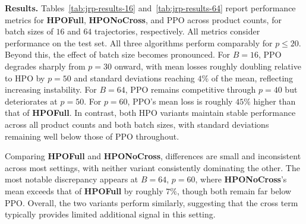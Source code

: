 \documentclass{article}
\theoremstyle{definition}
\theoremstyle{remark}
\begin{document}
\textbf{Results.} Tables~\ref{tab:jrp-results-16} and~\ref{tab:jrp-results-64} report 
performance metrics for \textbf{HPOFull}, \textbf{HPONoCross}, and PPO across product counts, for batch 
sizes of $16$ and $64$ trajectories, respectively. All metrics consider performance on the test set. All three algorithms perform 
comparably for $p \leq 20$. Beyond this, the effect of batch size becomes pronounced. 
For $B = 16$, PPO degrades sharply from $p = 30$ onward, with mean losses roughly 
doubling relative to HPO by $p = 50$ and standard deviations reaching $4\%$ of the 
mean, reflecting increasing instability. For $B = 64$, PPO remains competitive through 
$p = 40$ but deteriorates at $p = 50$. For $p=60$, PPO's mean loss is roughly $45\%$ 
higher than that of \textbf{HPOFull}. In contrast, both HPO variants maintain stable performance across all product counts and both batch sizes, with standard deviations remaining well below those of PPO throughout.

Comparing \textbf{HPOFull} and \textbf{HPONoCross}, differences are small and inconsistent across most 
settings, with neither variant consistently dominating the other. The most notable 
discrepancy appears at $B = 64$, $p = 60$, where \textbf{HPONoCross}'s mean exceeds that of \textbf{HPOFull} by roughly $7\%$, though both remain far below PPO. Overall, the 
two variants perform similarly, suggesting that the cross term typically provides limited 
additional signal in this setting.
\end{document}
